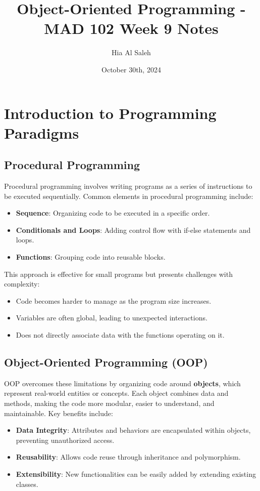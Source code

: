 \documentclass{article}
\title{Object-Oriented Programming - MAD 102 Week 9 Notes}
\author{Hia Al Saleh}
\date{October 30th, 2024}
\begin{document}
\maketitle
\tableofcontents
\newpage

\section{Introduction to Programming Paradigms}
\subsection{Procedural Programming}
Procedural programming involves writing programs as a series of instructions to be executed sequentially. Common elements in procedural programming include:
\begin{itemize}
    \item \textbf{Sequence}: Organizing code to be executed in a specific order.
    \item \textbf{Conditionals and Loops}: Adding control flow with if-else statements and loops.
    \item \textbf{Functions}: Grouping code into reusable blocks.
\end{itemize}

This approach is effective for small programs but presents challenges with complexity:
\begin{itemize}
    \item Code becomes harder to manage as the program size increases.
    \item Variables are often global, leading to unexpected interactions.
    \item Does not directly associate data with the functions operating on it.
\end{itemize}

\subsection{Object-Oriented Programming (OOP)}
OOP overcomes these limitations by organizing code around \textbf{objects}, which represent real-world entities or concepts. Each object combines data and methods, making the code more modular, easier to understand, and maintainable. Key benefits include:
\begin{itemize}
    \item \textbf{Data Integrity}: Attributes and behaviors are encapsulated within objects, preventing unauthorized access.
    \item \textbf{Reusability}: Allows code reuse through inheritance and polymorphism.
    \item \textbf{Extensibility}: New functionalities can be easily added by extending existing classes.
\end{itemize}
\end{document}
